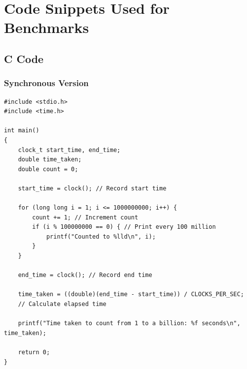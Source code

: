 \documentclass[12pt,a4paper]{article}
\begin{document}
\section{Code Snippets Used for Benchmarks}

\subsection{C Code}

\subsubsection{Synchronous Version}
\begin{verbatim}
#include <stdio.h>
#include <time.h>

int main() 
{
    clock_t start_time, end_time;
    double time_taken;
    double count = 0;

    start_time = clock(); // Record start time

    for (long long i = 1; i <= 1000000000; i++) {
        count += 1; // Increment count
        if (i % 100000000 == 0) { // Print every 100 million
            printf("Counted to %lld\n", i);
        }
    }

    end_time = clock(); // Record end time

    time_taken = ((double)(end_time - start_time)) / CLOCKS_PER_SEC; 
    // Calculate elapsed time

    printf("Time taken to count from 1 to a billion: %f seconds\n", time_taken);

    return 0;
}
\end{verbatim}
\end{document}
